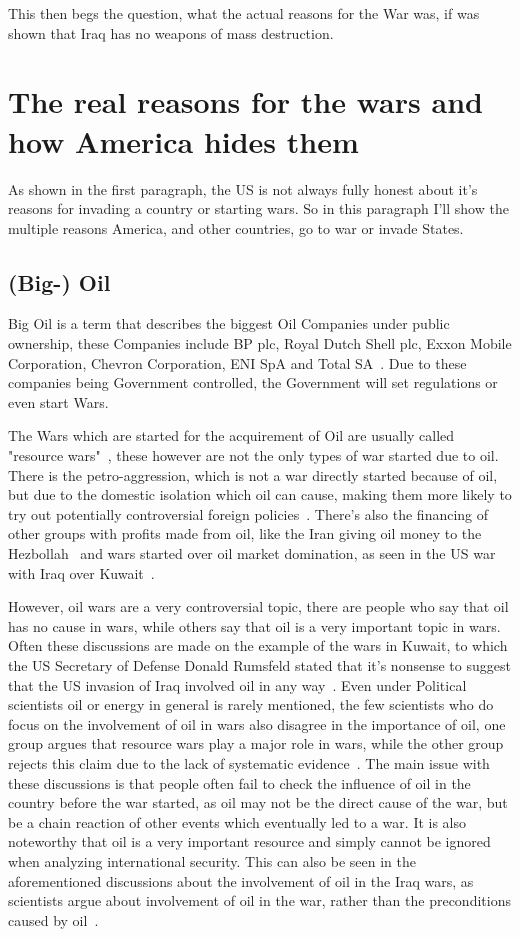 \documentclass[12pt,a4paper]{article}
\begin{document}
		This then begs the question, what the actual reasons for the War was, if was shown that Iraq has no weapons of mass destruction.
	\section{The real reasons for the wars and how America hides them}
		As shown in the first paragraph, the US is not always fully honest about it's reasons for invading a country or starting wars. So in this paragraph I'll show the multiple reasons America, and other countries, go to war or invade States.
		\subsection{(Big-) Oil}
		Big Oil is a term that describes the biggest Oil Companies under public ownership, these Companies include BP plc, Royal Dutch Shell plc, Exxon Mobile Corporation, Chevron Corporation, ENI SpA and Total SA~\cite{financial-dictionary-big-oil}. Due to these companies being Government controlled, the Government will set regulations or even start Wars.
		
		The Wars which are started for the acquirement of Oil are usually called "resource wars"~\cite{belfercenter-oil-conflict}, these however are not the only types of war started due to oil. There is the petro-aggression, which is not a war directly started because of oil, but due to the domestic isolation which oil can cause, making them more likely to try out potentially controversial foreign policies~\cite{belfercenter-oil-conflict}. There's also the financing of other groups with profits made from oil, like the Iran giving oil money to the Hezbollah~\cite{ny-times-lebanon-hezbollah-fuel} and wars started over oil market domination, as seen in the US war with Iraq over Kuwait~\cite{britannica-persian-gulf-war}.
		
		However, oil wars are a very controversial topic, there are people who say that oil has no cause in wars, while others say that oil is a very important topic in wars. Often these discussions are made on the example of the wars in Kuwait, to which the US Secretary of Defense Donald Rumsfeld stated that it's nonsense to suggest that the US invasion of Iraq involved oil in any way~\cite{stokes_blood_for_oil}. Even under Political scientists oil or energy in general is rarely mentioned, the few scientists who do focus on the involvement of oil in wars also disagree in the importance of oil, one group argues that resource wars play a major role in wars, while the other group rejects this claim due to the lack of systematic evidence~\cite{fueling-fire-jeff-d}. The main issue with these discussions is that people often fail to check the influence of oil in the country before the war started, as oil may not be the direct cause of the war, but be a chain reaction of other events which eventually led to a war. It is also noteworthy that oil is a very important resource and simply cannot be ignored when analyzing international security. This can also be seen in the aforementioned discussions about the involvement of oil in the Iraq wars, as scientists argue about involvement of oil in the war, rather than the preconditions caused by oil~\cite{fueling-fire-jeff-d}.
\end{document}
